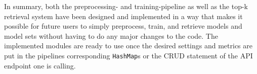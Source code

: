 In summary, both the preprocessing- and training-pipeline as well as the top-k retrieval system have been designed and implemented in a way that makes it possible for future users to simply preprocess, train, and retrieve models and model sets without having to do any major changes to the code. The implemented modules are ready to use once the desired settings and metrics are put in the pipelines corresponding \texttt{HashMap}s or the CRUD statement of the API endpoint one is calling.




